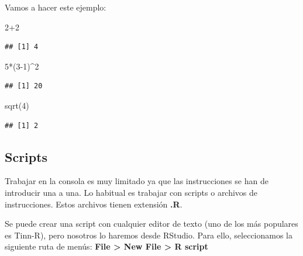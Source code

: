 \documentclass[
]{book}
\newenvironment{Shaded}{\begin{snugshade}}{\end{snugshade}}
\newcommand{\DecValTok}[1]{\textcolor[rgb]{0.00,0.00,0.81}{#1}}
\newcommand{\FunctionTok}[1]{\textcolor[rgb]{0.00,0.00,0.00}{#1}}
\newcommand{\NormalTok}[1]{#1}
\newcommand{\SpecialCharTok}[1]{\textcolor[rgb]{0.00,0.00,0.00}{#1}}
\begin{document}
Vamos a hacer este ejemplo:

\begin{Shaded}
\begin{Highlighting}[]
\DecValTok{2}\SpecialCharTok{+}\DecValTok{2}
\end{Highlighting}
\end{Shaded}

\begin{verbatim}
## [1] 4
\end{verbatim}

\begin{Shaded}
\begin{Highlighting}[]
\DecValTok{5}\SpecialCharTok{*}\NormalTok{(}\DecValTok{3{-}1}\NormalTok{)}\SpecialCharTok{\^{}}\DecValTok{2}
\end{Highlighting}
\end{Shaded}

\begin{verbatim}
## [1] 20
\end{verbatim}

\begin{Shaded}
\begin{Highlighting}[]
\FunctionTok{sqrt}\NormalTok{(}\DecValTok{4}\NormalTok{)}
\end{Highlighting}
\end{Shaded}

\begin{verbatim}
## [1] 2
\end{verbatim}

\hypertarget{scripts}{%
\subsection{Scripts}\label{scripts}}

Trabajar en la consola es muy limitado ya que las instrucciones se han de introducir una a una. Lo habitual es trabajar con scripts o archivos de instrucciones. Estos archivos tienen extensión \textbf{.R}.

Se puede crear una script con cualquier editor de texto (uno de los más populares es Tinn-R), pero nosotros lo haremos desde RStudio. Para ello, seleccionamos la siguiente ruta de menús: \textbf{File \textgreater{} New File \textgreater{} R script}
\end{document}
